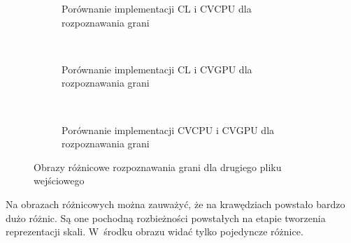 \begin{figure}[h]
\begin{subfigure}[t]{0.3\textwidth}
	\centering
	\setlength\fboxsep{0pt}
	\setlength\fboxrule{0.5pt}
	\caption{Porównanie implementacji CL i CVCPU dla rozpoznawania grani}
	\label{fig:valRidge4CLCVCPU}
\end{subfigure}
~
\begin{subfigure}[t]{0.3\textwidth}
	\centering
	\setlength\fboxsep{0pt}
	\setlength\fboxrule{0.5pt}
	\caption{Porównanie implementacji CL i CVGPU dla rozpoznawania grani}
	\label{fig:valRidge4CLCVGPU}
\end{subfigure}
~
\begin{subfigure}[t]{0.3\textwidth}
	\centering
	\setlength\fboxsep{0pt}
	\setlength\fboxrule{0.5pt}
	\caption{Porównanie implementacji CVCPU i CVGPU dla rozpoznawania grani}
	\label{fig:valRidge4CVCPUCVGPU}                 
\end{subfigure}
\caption{Obrazy różnicowe rozpoznawania grani dla drugiego pliku wejściowego}

\label{fig:valRidge4}
\end{figure}

Na obrazach różnicowych można zauważyć, że na krawędziach powstało bardzo dużo różnic. Są one pochodną rozbieżności powstałych na etapie tworzenia reprezentacji skali. W~środku obrazu widać tylko pojedyncze różnice. 
